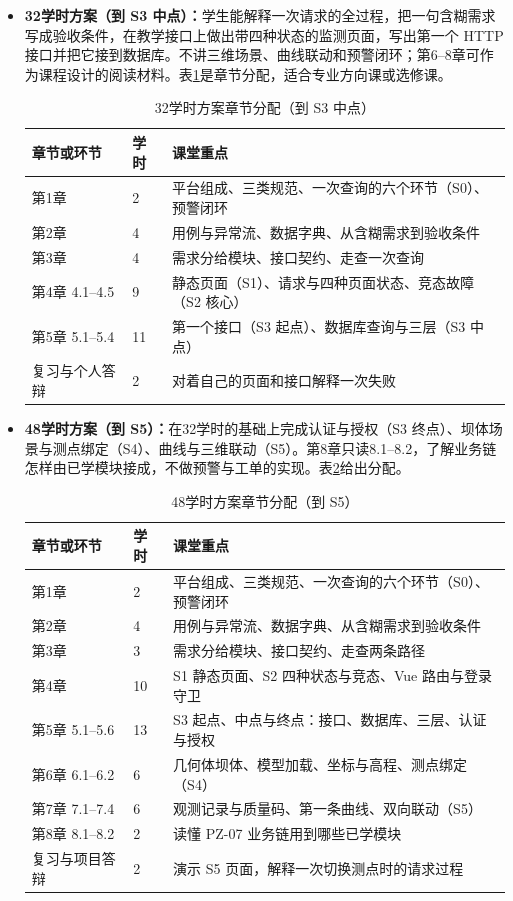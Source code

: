 \begin{itemize}
\item \textbf{32学时方案（到 S3 中点）：}学生能解释一次请求的全过程，把一句含糊需求写成验收条件，在教学接口上做出带四种状态的监测页面，写出第一个 HTTP 接口并把它接到数据库。不讲三维场景、曲线联动和预警闭环；第6--8章可作为课程设计的阅读材料。表\ref{tab:preface-32-hours}是章节分配，适合专业方向课或选修课。
\begin{table}[htbp]
\centering
\caption{32学时方案章节分配（到 S3 中点）}
\label{tab:preface-32-hours}
\begin{tabular}{p{2.8cm}p{1.4cm}p{8.2cm}}
\toprule
章节或环节 & 学时 & 课堂重点 \\
\midrule
第1章 & 2 & 平台组成、三类规范、一次查询的六个环节（S0）、预警闭环 \\
第2章 & 4 & 用例与异常流、数据字典、从含糊需求到验收条件 \\
第3章 & 4 & 需求分给模块、接口契约、走查一次查询 \\
第4章 4.1--4.5 & 9 & 静态页面（S1）、请求与四种页面状态、竞态故障（S2 核心） \\
第5章 5.1--5.4 & 11 & 第一个接口（S3 起点）、数据库查询与三层（S3 中点） \\
复习与个人答辩 & 2 & 对着自己的页面和接口解释一次失败 \\
\bottomrule
\end{tabular}
\end{table}

\item \textbf{48学时方案（到 S5）：}在32学时的基础上完成认证与授权（S3 终点）、坝体场景与测点绑定（S4）、曲线与三维联动（S5）。第8章只读8.1--8.2，了解业务链怎样由已学模块接成，不做预警与工单的实现。表\ref{tab:preface-48-hours}给出分配。
\begin{table}[htbp]
\centering
\caption{48学时方案章节分配（到 S5）}
\label{tab:preface-48-hours}
\begin{tabular}{p{2.8cm}p{1.4cm}p{8.2cm}}
\toprule
章节或环节 & 学时 & 课堂重点 \\
\midrule
第1章 & 2 & 平台组成、三类规范、一次查询的六个环节（S0）、预警闭环 \\
第2章 & 4 & 用例与异常流、数据字典、从含糊需求到验收条件 \\
第3章 & 3 & 需求分给模块、接口契约、走查两条路径 \\
第4章 & 10 & S1 静态页面、S2 四种状态与竞态、Vue 路由与登录守卫 \\
第5章 5.1--5.6 & 13 & S3 起点、中点与终点：接口、数据库、三层、认证与授权 \\
第6章 6.1--6.2 & 6 & 几何体坝体、模型加载、坐标与高程、测点绑定（S4） \\
第7章 7.1--7.4 & 6 & 观测记录与质量码、第一条曲线、双向联动（S5） \\
第8章 8.1--8.2 & 2 & 读懂 PZ-07 业务链用到哪些已学模块 \\
复习与项目答辩 & 2 & 演示 S5 页面，解释一次切换测点时的请求过程 \\
\bottomrule
\end{tabular}
\end{table}


\end{itemize}
